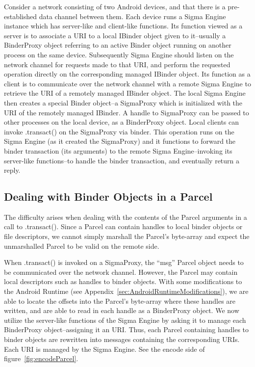 \documentclass[prodmode]{acmlarge}
\begin{document}

Consider a network consisting of two Android devices, and that there is a pre-established data channel between them. Each device runs a Sigma Engine instance which has server-like and client-like functions. Its function viewed as a server is to associate a URI to a local IBinder object given to it--usually a BinderProxy object referring to an active Binder object running on another process on the same device. Subsequently Sigma Engine should listen on the network channel for requests made to that URI, and perform the requested operation directly on the corresponding managed IBinder object. Its function as a client is to communicate over the network channel with a remote Sigma Engine to retrieve the URI of a remotely managed IBinder object. The local Sigma Engine then creates a special Binder object--a SigmaProxy which is initialized with the URI of the remotely managed IBinder. A handle to SigmaProxy can be passed to other processes on the local device, as a BinderProxy object. Local clients can invoke .transact() on the SigmaProxy via binder. This operation runs on the Sigma Engine (as it created the SigmaProxy) and it functions to forward the binder transaction (its arguments) to the remote Sigma Engine--invoking its server-like functions--to handle the binder transaction, and eventually return a reply.

\subsection{Dealing with Binder Objects in a Parcel}
The difficulty arises when dealing with the contents of the Parcel arguments in a call to .transact(). Since a Parcel can contain handles to local binder objects or file descriptors, we cannot simply marshall the Parcel's byte-array and expect the unmarshalled Parcel to be valid on the remote side.

When .transact() is invoked on a SigmaProxy, the ``msg'' Parcel object needs to be communicated over the network channel. However, the Parcel may contain local descriptors such as handles to binder objects. With some modifications to the Android Runtime (see Appendix~\ref{sec:AndroidRuntimeModifications}), we are able to locate the offsets into the Parcel's byte-array where these handles are written, and are able to read in each handle as a BinderProxy object. We now utilize the server-like functions of the Sigma Engine by asking it to manage each BinderProxy object--assigning it an URI. Thus, each Parcel containing handles to binder objects are rewritten into messages containing the corresponding URIs. Each URI is managed by the Sigma Engine. See the encode side of figure~\ref{fig:encodeParcel}.
\end{document}
